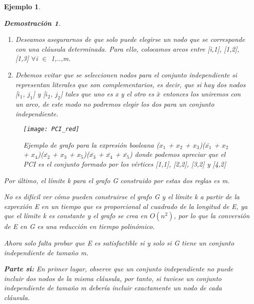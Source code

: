 \documentclass[a4paper,12pt,titlepage]{article}
\newtheorem{eje}{Ejemplo}[section]
\newtheorem*{dem}{\textbf{Demostraci\'on}}
\begin{document}
\begin{eje}
\begin{dem}
\begin{enumerate}
\item Deseamos asegurarnos de que solo puede elegirse un nodo que se corresponde con una cl\'ausula determinada. Para ello, colocamos arcos entre [i,1], [1,2], [1,3] $\forall$i $\in$ {1,..,m}.

\item Debemos evitar que se seleccionen nodos para el conjunto independiente si representan literales que son complementarios, es decir, que si hay dos nodos [$i_1$, $j_1$] y [$i_2$, $j_2$] tales que uno es x y el otro es $\bar{x}$ entonces los uniremos con un arco, de este modo no podremos elegir los dos para un conjunto independiente.

\end{enumerate}

\begin{figure}[h]
\centering
\texttt{[image: PCI\_red]}
\caption{Ejemplo de grafo para la expresi\'on booleana ($x_1$ + $x_2$ + $x_3$)($\bar{x_1}$ + $x_2$ + $x_4$)($\bar{x_2}$ + $x_3$ + $x_5$)($\bar{x_3}$ + $\bar{x_4}$ + $\bar{x_5}$) donde podemos apreciar que el PCI es el conjunto formado por los v\'ertices [1,1], [2,2], [3,2] y [4,2]}
\label{PCI_red}
\end{figure}

Por \'ultimo, el l\'imite k para el grafo G construido por estas dos reglas es m.

\vspace{\baselineskip}

No es dif\'icil ver c\'omo pueden construirse el grafo G y el l\'imite k a partir de la exprexi\'on E en un tiempo que es proporcional al cuadrado de la longitud de E, ya que el l\'imite k es constante y el grafo se crea en $O(n^2)$, por lo que la conversi\'on de E en G es una reducci\'on en tiempo polin\'omico.

\vspace{\baselineskip}

Ahora solo falta probar que E es satisfactible si y solo si G tiene un conjunto independiente de tamaño m.

\vspace{\baselineskip}

\textbf{Parte si:} En primer lugar, observe que un conjunto independiente no puede incluir dos nodos de la misma cl\'ausula, por tanto, si tuviese un conjunto independiente de tamaño m deber\'ia incluir exactamente un nodo de cada cl\'ausula.


\end{dem}
\end{eje}
\end{document}
